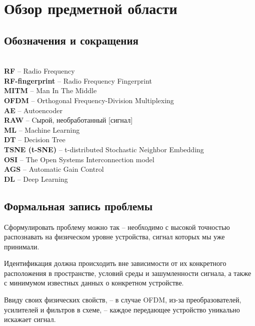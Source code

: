 \chapter{Обзор предметной области}
\label{chap:obzor}

    \section{Обозначения и сокращения} 
        \noindent\\
	    \textbf{RF} -- Radio Frequency \\
	    \textbf{RF-fingerprint} -- Radio Frequency Fingerprint \\
	    \textbf{MITM} -- Man In The Middle \\
	    \textbf{OFDM} -- Orthogonal Frequency-Division Multiplexing \\
	    \textbf{AE} -- Autoencoder\\
	    \textbf{RAW} -- Cырой, необработанный [сигнал]\\
        \textbf{ML} -- Machine Learning\\
	    \textbf{DT} -- Decision Tree\\
	    \textbf{TSNE (t-SNE)} -- t-distributed Stochastic Neighbor Embedding\\
	    \textbf{OSI} -- The Open Systems Interconnection model\\
	    \textbf{AGS} -- Automatic Gain Control\\
	    \textbf{DL} -- Deep Learning\\

    \newpage
    \section{Формальная запись проблемы}
        \par
            Сформулировать проблему можно так – необходимо с высокой точностью распознавать на физическом уровне устройства, сигнал которых мы уже принимали. \\
        \par
            Идентификация должна происходить вне зависимости от их конкретного расположения в пространстве, условий среды и зашумленности сигнала, а также с минимумом известных данных о конкретном устройстве. \\
        
        \par
            Ввиду своих физических свойств, – в случае OFDM, из-за преобразователей, усилителей и фильтров в схеме, – каждое передающее устройство уникально искажает сигнал. \\
            
